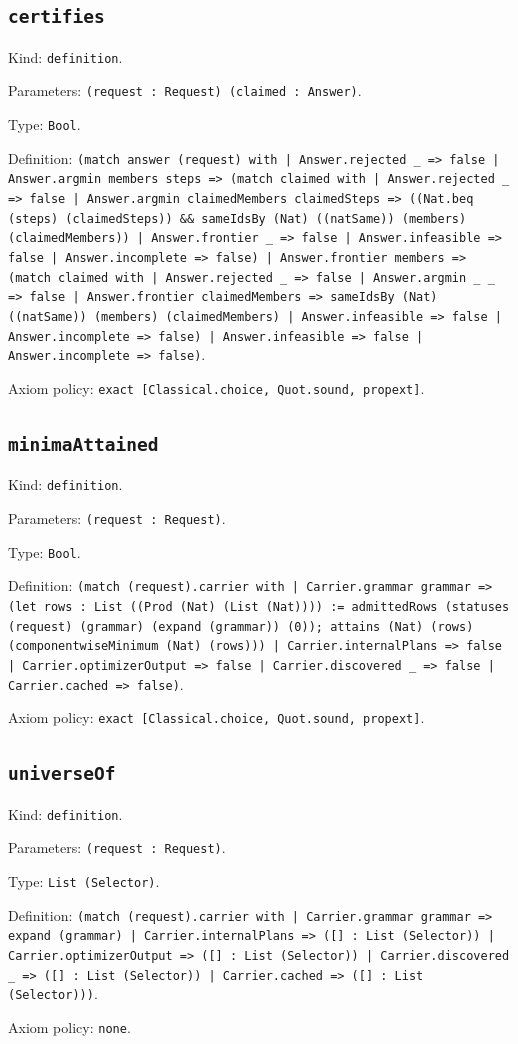 \documentclass[11pt]{article}
\begin{document}
\subsection*{\texttt{certifies}}
\noindent Kind: \texttt{definition}.\par
\noindent Parameters: \texttt{(request : Request) (claimed : Answer)}.\par
\noindent Type: \texttt{Bool}.\par
\noindent Definition: \texttt{(match answer (request) with | Answer.rejected \_ => false | Answer.argmin members steps => (match claimed with | Answer.rejected \_ => false | Answer.argmin claimedMembers claimedSteps => ((Nat.beq (steps) (claimedSteps)) \&\& sameIdsBy (Nat) ((natSame)) (members) (claimedMembers)) | Answer.frontier \_ => false | Answer.infeasible => false | Answer.incomplete => false) | Answer.frontier members => (match claimed with | Answer.rejected \_ => false | Answer.argmin \_ \_ => false | Answer.frontier claimedMembers => sameIdsBy (Nat) ((natSame)) (members) (claimedMembers) | Answer.infeasible => false | Answer.incomplete => false) | Answer.infeasible => false | Answer.incomplete => false)}.\par
\noindent Axiom policy: \texttt{exact [Classical.choice, Quot.sound, propext]}.\par
\subsection*{\texttt{minimaAttained}}
\noindent Kind: \texttt{definition}.\par
\noindent Parameters: \texttt{(request : Request)}.\par
\noindent Type: \texttt{Bool}.\par
\noindent Definition: \texttt{(match (request).carrier with | Carrier.grammar grammar => (let rows : List ((Prod (Nat) (List (Nat)))) := admittedRows (statuses (request) (grammar) (expand (grammar)) (0)); attains (Nat) (rows) (componentwiseMinimum (Nat) (rows))) | Carrier.internalPlans => false | Carrier.optimizerOutput => false | Carrier.discovered \_ => false | Carrier.cached => false)}.\par
\noindent Axiom policy: \texttt{exact [Classical.choice, Quot.sound, propext]}.\par
\subsection*{\texttt{universeOf}}
\noindent Kind: \texttt{definition}.\par
\noindent Parameters: \texttt{(request : Request)}.\par
\noindent Type: \texttt{List (Selector)}.\par
\noindent Definition: \texttt{(match (request).carrier with | Carrier.grammar grammar => expand (grammar) | Carrier.internalPlans => ([] : List (Selector)) | Carrier.optimizerOutput => ([] : List (Selector)) | Carrier.discovered \_ => ([] : List (Selector)) | Carrier.cached => ([] : List (Selector)))}.\par
\noindent Axiom policy: \texttt{none}.\par
\end{document}
